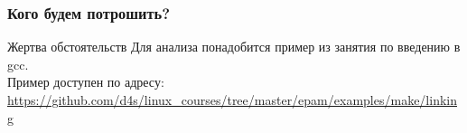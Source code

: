 
\begin{frame}
	\frametitle{Кого будем потрошить?}

	\begin{block}{Жертва обстоятельств}
		Для анализа понадобится пример из занятия по введению в gcc.\\
		Пример доступен по адресу:\\
		 \url{https://github.com/d4s/linux\_courses/tree/master/epam/examples/make/linking}
	\end{block}
\end{frame}
